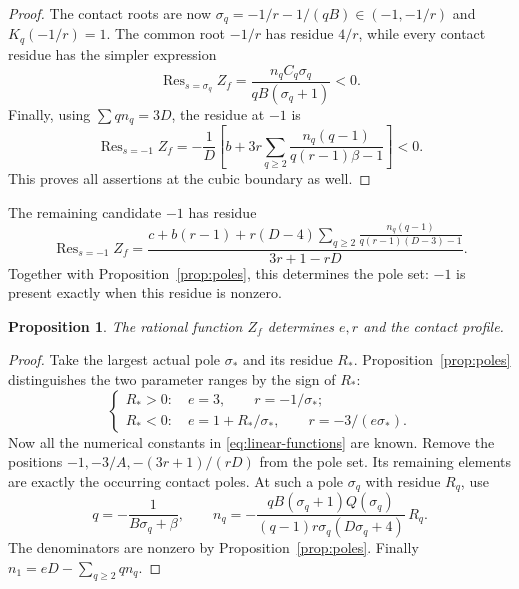 \documentclass[11pt]{article}
\numberwithin{equation}{section}
\newtheorem{proposition}[theorem]{Proposition}
\theoremstyle{definition}
\theoremstyle{remark}
\DeclareMathOperator{\Res}{Res}
\begin{document}
\begin{proof}
The contact roots are now
$\sigma_q=-1/r-1/(qB)\in(-1,-1/r)$ and $K_q(-1/r)=1$.
The common root $-1/r$ has residue $4/r$, while every contact
residue has the simpler expression
\begin{equation}\label{eq:cubic-contact-residue}
 \Res_{s=\sigma_q}Z_f
       =\frac{n_qC_q\sigma_q}{qB(\sigma_q+1)}<0.
\end{equation}
Finally, using $\sum qn_q=3D$, the residue at $-1$ is
\begin{equation}\label{eq:cubic-minus-one}
 \Res_{s=-1}Z_f
   =-\frac1D\left[
       b+3r\sum_{q\ge2}
          \frac{n_q(q-1)}{q(r-1)\beta-1}\right]<0.
\end{equation}
This proves all assertions at the cubic boundary as well.
\end{proof}

The remaining candidate $-1$ has residue
\begin{equation}\label{eq:minus-one-residue}
 \Res_{s=-1}Z_f
 =\frac{\displaystyle c+b(r-1)+r(D-4)
       \sum_{q\ge2}\frac{n_q(q-1)}
                  {q(r-1)(D-3)-1}}
        {3r+1-rD}.
\end{equation}
Together with Proposition~\ref{prop:poles}, this determines the
pole set: $-1$ is present exactly when this residue is nonzero.

\begin{proposition}\label{prop:z-recovery}
The rational function $Z_f$ determines $e,r$ and the contact
profile.
\end{proposition}

\begin{proof}
Take the largest actual pole $\sigma_*$ and its residue $R_*$.
Proposition~\ref{prop:poles} distinguishes the two parameter
ranges by the sign of $R_*$:
\begin{equation}\label{eq:z-parameter-recovery}
 \begin{cases}
  R_*>0:\quad e=3,\qquad r=-1/\sigma_*;\\
  R_*<0:\quad e=1+R_*/\sigma_*,
           \qquad r=-3/(e\sigma_*).
 \end{cases}
\end{equation}
Now all the numerical constants in
\eqref{eq:linear-functions} are known. Remove the positions
$-1,-3/A,-(3r+1)/(rD)$ from the pole set. Its remaining
elements are exactly the occurring contact poles.
At such a pole $\sigma_q$ with residue $R_q$, use
\begin{equation}\label{eq:z-contact-recovery}
 q=-\frac1{B\sigma_q+\beta},\qquad
 n_q=-\frac{qB(\sigma_q+1)Q(\sigma_q)}
         {(q-1)r\sigma_q(D\sigma_q+4)}\,R_q.
\end{equation}
The denominators are nonzero by
Proposition~\ref{prop:poles}. Finally
$n_1=eD-\sum_{q\ge2}qn_q$.
\end{proof}
\end{document}
